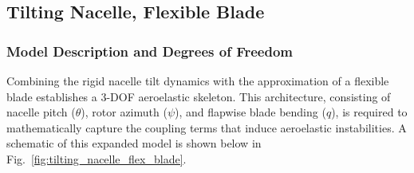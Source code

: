 \documentclass[final,onecolumn]{IEEEtran}
\begin{document}
\newpage
\subsection{Tilting Nacelle, Flexible Blade}\label{sec:tilting_nacelle_flex_blade}

\subsubsection{Model Description and Degrees of Freedom}
\label{sec:model2_description}
Combining the rigid nacelle tilt dynamics with the approximation of a flexible blade establishes a 3-DOF aeroelastic skeleton. This architecture, consisting of nacelle pitch ($\theta$), rotor azimuth ($\psi$), and flapwise blade bending ($q$), is required to mathematically capture the coupling terms that induce aeroelastic instabilities. A schematic of this expanded model is shown below in Fig.~\ref{fig:tilting_nacelle_flex_blade}.
\end{document}
